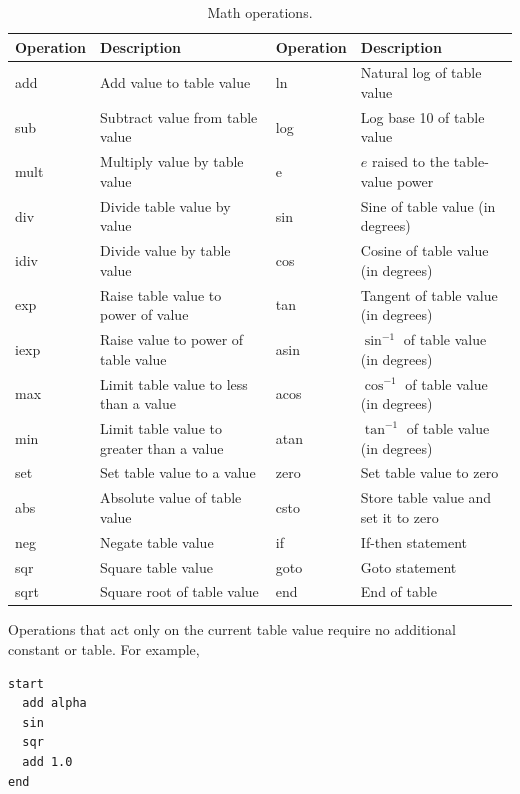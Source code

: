 \begin{table}[htbp]
  \centering
  \caption{Math operations.}
  \label{tab:math-operations}
  \small
  \begin{tabularx}{\linewidth}{@{}>{\ttfamily}lX>{\ttfamily}lX@{}}
    \toprule
    \normalfont Operation & Description & \normalfont Operation & Description \\
    \midrule
    add  & Add value to table value & ln   & Natural log of table value \\
    sub  & Subtract value from table value & log  & Log base 10 of table value \\
    mult & Multiply value by table value & e    & $e$ raised to the table-value power \\
    div  & Divide table value by value & sin  & Sine of table value (in degrees) \\
    idiv & Divide value by table value & cos  & Cosine of table value (in degrees) \\
    exp  & Raise table value to power of value & tan  & Tangent of table value (in degrees) \\
    iexp & Raise value to power of table value & asin & $\sin^{-1}$ of table value (in degrees) \\
    max  & Limit table value to less than a value & acos & $\cos^{-1}$ of table value (in degrees) \\
    min  & Limit table value to greater than a value & atan & $\tan^{-1}$ of table value (in degrees) \\
    set  & Set table value to a value & zero & Set table value to zero \\
    abs  & Absolute value of table value & csto & Store table value and set it to zero \\
    neg  & Negate table value & if   & If-then statement \\
    sqr  & Square table value & goto & Goto statement \\
    sqrt & Square root of table value & end  & End of table \\
    \bottomrule
  \end{tabularx}
\end{table}

Operations that act only on the current table value require no additional constant or
table. For example,

\begin{lstlisting}[style=taosmanual]
start
  add alpha
  sin
  sqr
  add 1.0
end
\end{lstlisting}

